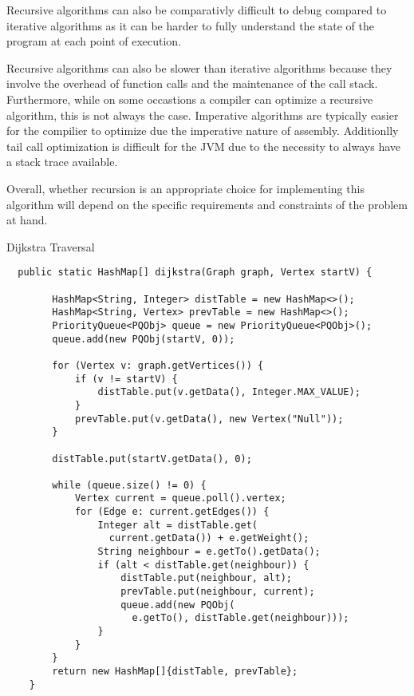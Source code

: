 \documentclass[a4paper]{article}
\begin{document}
Recursive algorithms can also be comparativly difficult to debug compared to iterative algorithms as
it can be harder to fully understand the state of the program at each point of execution. \\
\vspace{4mm}

Recursive algorithms can also be slower than iterative algorithms because they involve the overhead of function calls and the maintenance of the call stack.
Furthermore, while on some occastions a compiler can optimize a recursive algorithm, this is not always the case. 
Imperative algorithms are typically 
easier for the compilier to optimize due the imperative nature of assembly.
Additionlly tail call optimization is difficult for the JVM due to the necessity to always have a stack trace available. \\
\vspace{4mm}

Overall, whether recursion is an appropriate choice for implementing this algorithm will depend on 
the specific requirements and constraints of the problem at hand. \\
\newpage
\begin{algorithm}
\caption{Dijkstra Traversal}\label{euclid}

\begin{verbatim}
  public static HashMap[] dijkstra(Graph graph, Vertex startV) {

        HashMap<String, Integer> distTable = new HashMap<>();
        HashMap<String, Vertex> prevTable = new HashMap<>();
        PriorityQueue<PQObj> queue = new PriorityQueue<PQObj>();
        queue.add(new PQObj(startV, 0));

        for (Vertex v: graph.getVertices()) {
            if (v != startV) {
                distTable.put(v.getData(), Integer.MAX_VALUE);
            }
            prevTable.put(v.getData(), new Vertex("Null"));
        }

        distTable.put(startV.getData(), 0);

        while (queue.size() != 0) {
            Vertex current = queue.poll().vertex;
            for (Edge e: current.getEdges()) {
                Integer alt = distTable.get(
                  current.getData()) + e.getWeight();
                String neighbour = e.getTo().getData();
                if (alt < distTable.get(neighbour)) {
                    distTable.put(neighbour, alt);
                    prevTable.put(neighbour, current);
                    queue.add(new PQObj(
                      e.getTo(), distTable.get(neighbour)));
                }
            }
        }
        return new HashMap[]{distTable, prevTable};
    }
\end{verbatim}
\end{algorithm}
\vspace{7mm}
\end{document}
